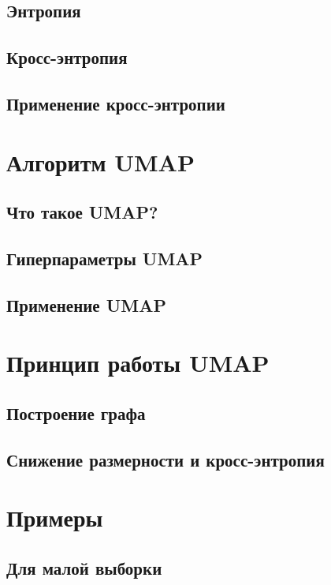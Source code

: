 \documentclass[a4paper, 12pt]{article}
\begin{document}
	\subsection{Энтропия}
		
	\subsection{Кросс-энтропия}
	
	\subsection{Применение кросс-энтропии}
	
	\newpage
	
	\section{Алгоритм UMAP}
	\subsection{Что такое UMAP?}
	
	\subsection{Гиперпараметры UMAP}
	
	\subsection{Применение UMAP}
	
	\newpage

	\section{Принцип работы UMAP}
	
	\subsection{Построение графа}
	
	\subsection{Снижение размерности и кросс-энтропия}
	
	\newpage
	
	\section{Примеры}
	\subsection{Для малой выборки}
	
\end{document}
